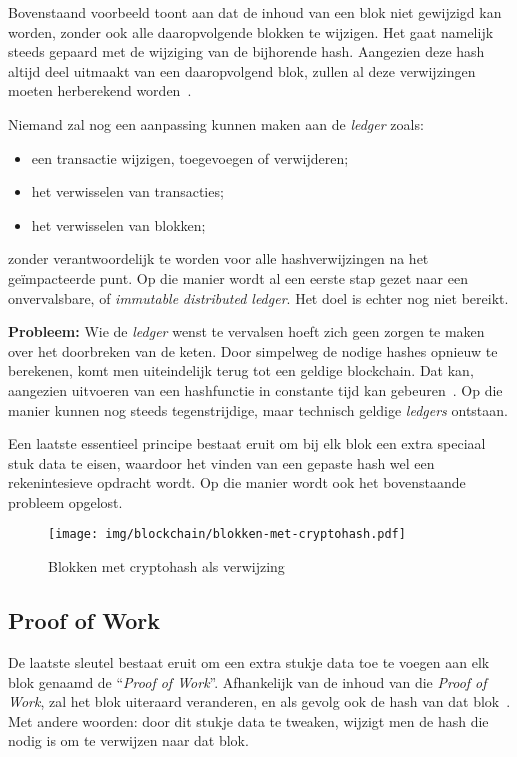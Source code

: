 Bovenstaand voorbeeld toont aan dat de inhoud van een blok niet gewijzigd kan worden, zonder ook alle daaropvolgende blokken te wijzigen. Het gaat namelijk steeds gepaard met de wijziging van de bijhorende hash. Aangezien deze hash altijd deel uitmaakt van een daaropvolgend blok, zullen al deze verwijzingen moeten herberekend worden~\autocite{Nakamoto2008}.

Niemand zal nog een aanpassing kunnen maken aan de \textit{ledger} zoals:
\begin{itemize}
	\item een transactie wijzigen, toegevoegen of verwijderen;
	\item het verwisselen van transacties;
	\item het verwisselen van blokken;
\end{itemize}

zonder verantwoordelijk te worden voor alle hashverwijzingen na het geïmpacteerde punt. Op die manier wordt al een eerste stap gezet naar een onvervalsbare, of \textit{immutable} \textit{distributed ledger}. Het doel is echter nog niet bereikt.

\textbf{Probleem:} 
Wie de \textit{ledger} wenst te vervalsen hoeft zich geen zorgen te maken over het doorbreken van de keten. 
Door simpelweg de nodige hashes opnieuw te berekenen, komt men uiteindelijk terug tot een geldige blockchain. Dat kan, aangezien uitvoeren van een hashfunctie in constante tijd kan gebeuren~\autocite{Slaats2019}. Op die manier kunnen nog steeds tegenstrijdige, maar technisch geldige \textit{ledgers} ontstaan.

Een laatste essentieel principe bestaat eruit om bij elk blok een extra speciaal stuk data te eisen, waardoor het vinden van een gepaste hash wel een rekenintesieve opdracht wordt. Op die manier wordt ook het bovenstaande probleem opgelost.

\begin{figure}[H]
	\centering
	\texttt{[image: img/blockchain/blokken-met-cryptohash.pdf]}
	\caption{\label{fig:blokken-met-cryptohash}Blokken met cryptohash als verwijzing}
\end{figure}

\subsection{Proof of Work}
\label{sub:proof-of-work}

De laatste sleutel bestaat eruit om een extra stukje data toe te voegen aan elk blok genaamd de ``\textit{Proof of Work}''.
Afhankelijk van de inhoud van die \textit{Proof of Work}, zal het blok uiteraard veranderen, en als gevolg ook de hash van dat blok~\autocite{Nakamoto2008}. Met andere woorden: door dit stukje data te tweaken, wijzigt men de hash die nodig is om te verwijzen naar dat blok.

